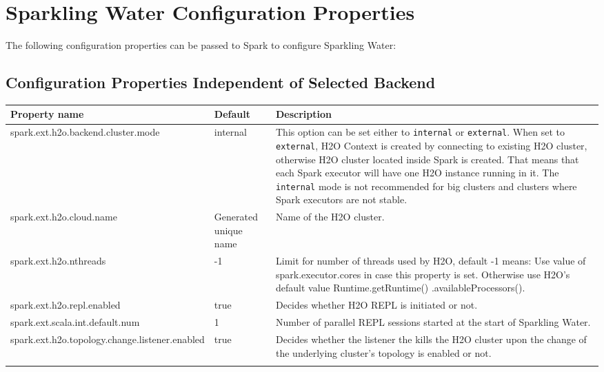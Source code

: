 \documentclass{standalone}
\begin{document}
	\section{Sparkling Water Configuration Properties}
	\label{sec:properties}

	The following configuration properties can be passed to Spark to configure Sparkling Water:

	\subsection{Configuration Properties Independent of Selected Backend}
	\begin{footnotesize}
		\begin{longtable}[!ht]{l p{2.0cm} p{3.0cm}}
			\toprule
			Property name & Default & Description \\
			\midrule

			spark.ext.h2o.backend.cluster.mode & internal & This option can be set either to \texttt{internal} or \texttt{external}. When set to \texttt{external}, H2O Context is created by connecting to existing H2O cluster, otherwise H2O cluster located inside Spark is created. That means that each Spark executor will have one H2O instance running in it. The \texttt{internal} mode is not recommended for big clusters and clusters where Spark executors are not stable. \\ \addlinespace

			spark.ext.h2o.cloud.name & Generated unique name & Name of the H2O cluster. \\ \addlinespace

			spark.ext.h2o.nthreads  & -1 & Limit for number of threads used by H2O, default -1 means: Use value of spark.executor.cores in case this property is set. Otherwise use H2O's default value Runtime.getRuntime() .availableProcessors(). \\ \addlinespace

			spark.ext.h2o.repl.enabled & true & Decides whether H2O REPL is initiated or not. \\ \addlinespace

			spark.ext.scala.int.default.num & 1 & Number of parallel REPL sessions started at the start of Sparkling Water. \\ \addlinespace

			spark.ext.h2o.topology.change.listener.enabled & true &  Decides whether the listener the kills the H2O cluster upon the change of the underlying cluster's topology is enabled or not. \\ \addlinespace


\end{longtable}
\end{footnotesize}
\end{document}
